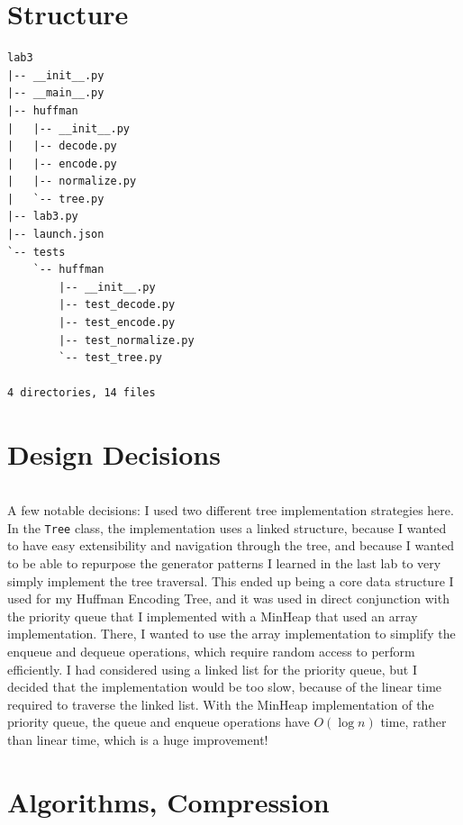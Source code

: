 \documentclass[10pt,letterpaper,final]{report}
\begin{document}
\clearpage\pagebreak

\section{Structure}\label{sec:structure}

\begin{verbatim}
lab3
|-- __init__.py
|-- __main__.py
|-- huffman
|   |-- __init__.py
|   |-- decode.py
|   |-- encode.py
|   |-- normalize.py
|   `-- tree.py
|-- lab3.py
|-- launch.json
`-- tests
    `-- huffman
        |-- __init__.py
        |-- test_decode.py
        |-- test_encode.py
        |-- test_normalize.py
        `-- test_tree.py

4 directories, 14 files

\end{verbatim}

\section{Design Decisions}

\begin{verbatim}
\end{verbatim}

A few notable decisions: I used two different tree implementation strategies here. In the \texttt{Tree} class, the implementation uses a linked structure, because I wanted to have easy extensibility and navigation through the tree, and because I wanted to be able to repurpose the generator patterns I learned in the last lab to very simply implement the tree traversal. This ended up being a core data structure I used for my Huffman Encoding Tree, and it was used in direct conjunction with the priority queue that I implemented with a MinHeap that used an array implementation. There, I wanted to use the array implementation to simplify the enqueue and dequeue operations, which require random access to perform efficiently. I had considered using a linked list for the priority queue, but I decided that the implementation would be too slow, because of the linear time required to traverse the linked list. With the MinHeap implementation of the priority queue, the queue and enqueue operations have $O(\log n)$ time, rather than linear time, which is a huge improvement!

\section{Algorithms, Compression}
\end{document}
